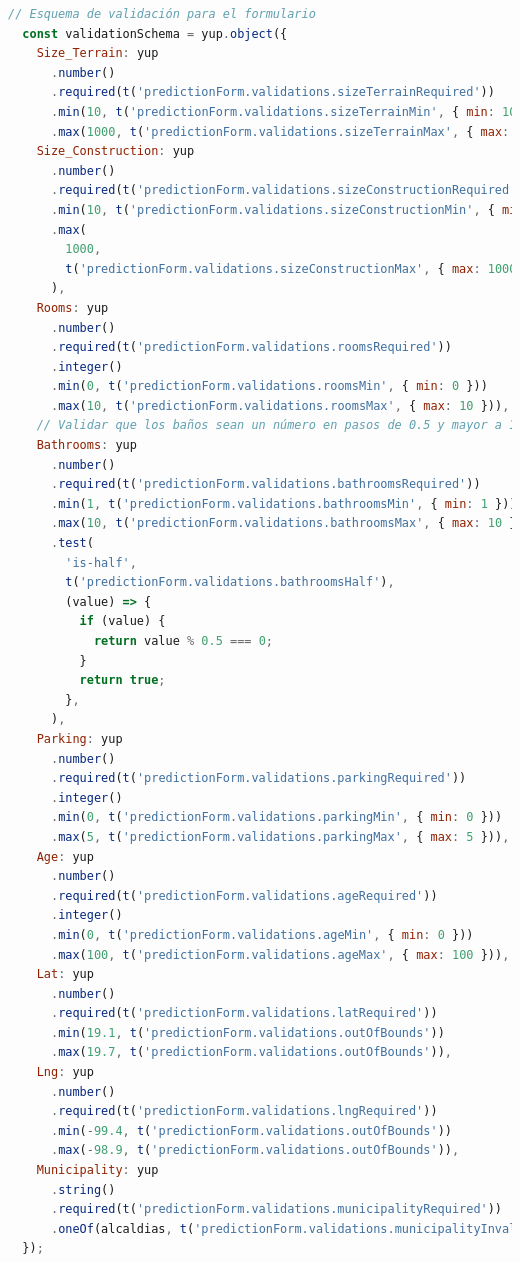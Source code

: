 \begin{lstlisting}[language=javascript, caption={Validación de campos}, label={lst:validacion-campos}]
  // Esquema de validación para el formulario
  const validationSchema = yup.object({
    Size_Terrain: yup
      .number()
      .required(t('predictionForm.validations.sizeTerrainRequired'))
      .min(10, t('predictionForm.validations.sizeTerrainMin', { min: 10 }))
      .max(1000, t('predictionForm.validations.sizeTerrainMax', { max: 1000 })),
    Size_Construction: yup
      .number()
      .required(t('predictionForm.validations.sizeConstructionRequired'))
      .min(10, t('predictionForm.validations.sizeConstructionMin', { min: 10 }))
      .max(
        1000,
        t('predictionForm.validations.sizeConstructionMax', { max: 1000 }),
      ),
    Rooms: yup
      .number()
      .required(t('predictionForm.validations.roomsRequired'))
      .integer()
      .min(0, t('predictionForm.validations.roomsMin', { min: 0 }))
      .max(10, t('predictionForm.validations.roomsMax', { max: 10 })),
    // Validar que los baños sean un número en pasos de 0.5 y mayor a 1 (mínimo 1 baño)
    Bathrooms: yup
      .number()
      .required(t('predictionForm.validations.bathroomsRequired'))
      .min(1, t('predictionForm.validations.bathroomsMin', { min: 1 }))
      .max(10, t('predictionForm.validations.bathroomsMax', { max: 10 }))
      .test(
        'is-half',
        t('predictionForm.validations.bathroomsHalf'),
        (value) => {
          if (value) {
            return value % 0.5 === 0;
          }
          return true;
        },
      ),
    Parking: yup
      .number()
      .required(t('predictionForm.validations.parkingRequired'))
      .integer()
      .min(0, t('predictionForm.validations.parkingMin', { min: 0 }))
      .max(5, t('predictionForm.validations.parkingMax', { max: 5 })),
    Age: yup
      .number()
      .required(t('predictionForm.validations.ageRequired'))
      .integer()
      .min(0, t('predictionForm.validations.ageMin', { min: 0 }))
      .max(100, t('predictionForm.validations.ageMax', { max: 100 })),
    Lat: yup
      .number()
      .required(t('predictionForm.validations.latRequired'))
      .min(19.1, t('predictionForm.validations.outOfBounds'))
      .max(19.7, t('predictionForm.validations.outOfBounds')),
    Lng: yup
      .number()
      .required(t('predictionForm.validations.lngRequired'))
      .min(-99.4, t('predictionForm.validations.outOfBounds'))
      .max(-98.9, t('predictionForm.validations.outOfBounds')),
    Municipality: yup
      .string()
      .required(t('predictionForm.validations.municipalityRequired'))
      .oneOf(alcaldias, t('predictionForm.validations.municipalityInvalid')),
  });
\end{lstlisting}

